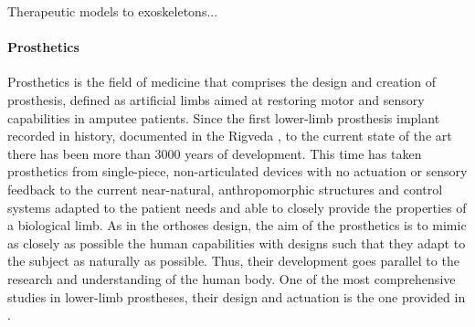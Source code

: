 Therapeutic models to exoskeletons... 

\paragraph{Prosthetics} %
\label{par:prosthetics}
Prosthetics is the field of medicine that comprises the design and creation of prosthesis, defined as artificial limbs aimed at restoring motor and sensory capabilities in amputee patients.
Since the first lower-limb prosthesis implant recorded in history, documented in the Rigveda \cite{prosthetics_history}, to the current state of the art there has been more than 3000 years of development.
This time has taken prosthetics from single-piece, non-articulated devices with no actuation or sensory feedback to the current near-natural, anthropomorphic structures and control systems adapted to the patient needs and able to closely provide the properties of a biological limb.
As in the orthoses design, the aim of the prosthetics is to mimic as closely as possible the human capabilities with designs such that they adapt to the subject as naturally as possible.
Thus, their development goes parallel to the research and understanding of the human body.
One of the most comprehensive studies in lower-limb prostheses, their design and actuation is the one provided in \cite{grimmer}.

